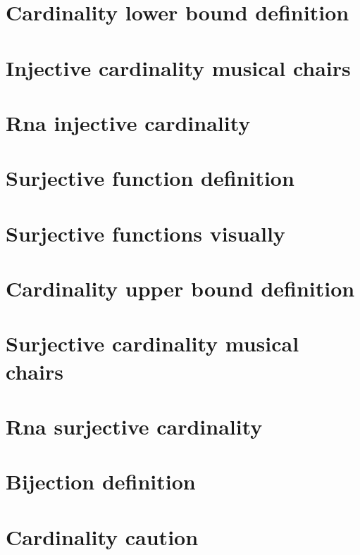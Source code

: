 \section*{Cardinality lower bound definition}

\vfill
\section*{Injective cardinality musical chairs}

\vfill
\section*{Rna injective cardinality}

\vfill
\section*{Surjective function definition}

\vfill
\section*{Surjective functions visually}

\vfill
\section*{Cardinality upper bound definition}

\vfill
\section*{Surjective cardinality musical chairs}

\vfill
\section*{Rna surjective cardinality}

\vfill
\section*{Bijection definition}

\vfill
\section*{Cardinality caution}

\vfill
